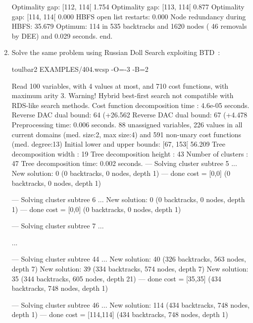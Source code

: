 \begin{enumerate}
{\begin{DoxyCode}
Optimality gap: [112, 114[ 1.754 %
Optimality gap: [113, 114[ 0.877 %
Optimality gap: [114, 114[ 0.000 %
HBFS open list restarts: 0.000 %
Node redundancy during HBFS: 35.679 %
Optimum: 114 in 535 backtracks and 1620 nodes ( 46 removals by DEE) and 0.029 seconds.
end.
\end{DoxyCode}}
\item Solve the same problem using Russian Doll Search exploiting BTD~\cite{Sanchez09a}:
\begin{DoxyCode}
	toulbar2 EXAMPLES/404.wcsp -O=-3 -B=2
\end{DoxyCode}
{\scriptsize
\begin{DoxyCode}
Read 100 variables, with 4 values at most, and 710 cost functions, with maximum arity 3.
Warning! Hybrid best-first search not compatible with RDS-like search methods.
Cost function decomposition time : 4.6e-05 seconds.
Reverse DAC dual bound: 64 (+26.562%
Reverse DAC dual bound: 67 (+4.478%
Preprocessing time: 0.006 seconds.
88 unassigned variables, 226 values in all current domains (med. size:2, max size:4) and 591 non-unary cost functions (med. degree:13)
Initial lower and upper bounds: [67, 153[ 56.209%
Tree decomposition width  : 19
Tree decomposition height : 43
Number of clusters        : 47
Tree decomposition time: 0.002 seconds.
--- Solving cluster subtree 5 ...
New solution: 0 (0 backtracks, 0 nodes, depth 1)
---  done  cost = [0,0] (0 backtracks, 0 nodes, depth 1)

--- Solving cluster subtree 6 ...
New solution: 0 (0 backtracks, 0 nodes, depth 1)
---  done  cost = [0,0] (0 backtracks, 0 nodes, depth 1)

--- Solving cluster subtree 7 ...

...

--- Solving cluster subtree 44 ...
New solution: 40 (326 backtracks, 563 nodes, depth 7)
New solution: 39 (334 backtracks, 574 nodes, depth 7)
New solution: 35 (344 backtracks, 605 nodes, depth 21)
---  done  cost = [35,35] (434 backtracks, 748 nodes, depth 1)

--- Solving cluster subtree 46 ...
New solution: 114 (434 backtracks, 748 nodes, depth 1)
---  done  cost = [114,114] (434 backtracks, 748 nodes, depth 1)


\end{DoxyCode}}
\end{enumerate}
